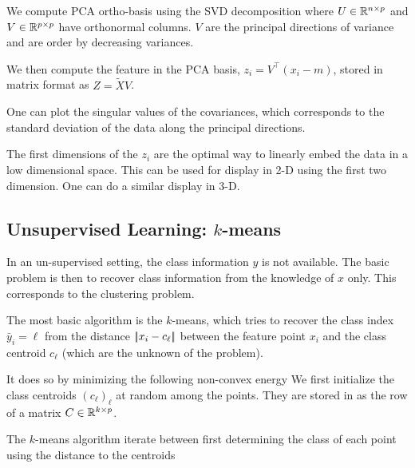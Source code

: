 

We compute PCA ortho-basis using the SVD decomposition
where $U \in \mathbb{R}^{n \times p}$ and $V \in \mathbb{R}^{p \times p}$ have
orthonormal columns. $V$ are the principal directions of variance and
are order by decreasing variances. 

We then compute the feature in the PCA basis, $z_i=V^\top (x_i-m) $, stored in matrix format as $Z=\tilde X V$.


One can plot the singular values of the covariances, which corresponds to the standard deviation of the data 
along the principal directions.



The first dimensions of the $z_i$ are the optimal way to linearly
embed the data in a low dimensional space. 
This can be used for display in 2-D using the first two dimension.
One can do a similar display in 3-D.






\subsection{Unsupervised Learning: $k$-means}

In an un-supervised setting, the class information $y$ is not
available. The basic problem is then to recover class information from
the knowledge of $x$ only. This corresponds to the clustering problem.



The most basic algorithm is the $k$-means, which tries to recover the
class index $\bar y_i=\ell$ from the distance $ |\!| x_i-c_\ell |\!| $
between the feature point $x_i$ and the class centroid $c_\ell$
(which are the unknown of the problem). 

It does so by minimizing the following non-convex energy
We first initialize the class centroids $ (c_\ell)_\ell $ at random among the points.
They are stored in as the row of a matrix $ C \in \mathbb{R}^{k \times p} $.


The $k$-means algorithm iterate between first determining the class of
each point using the distance to the centroids

